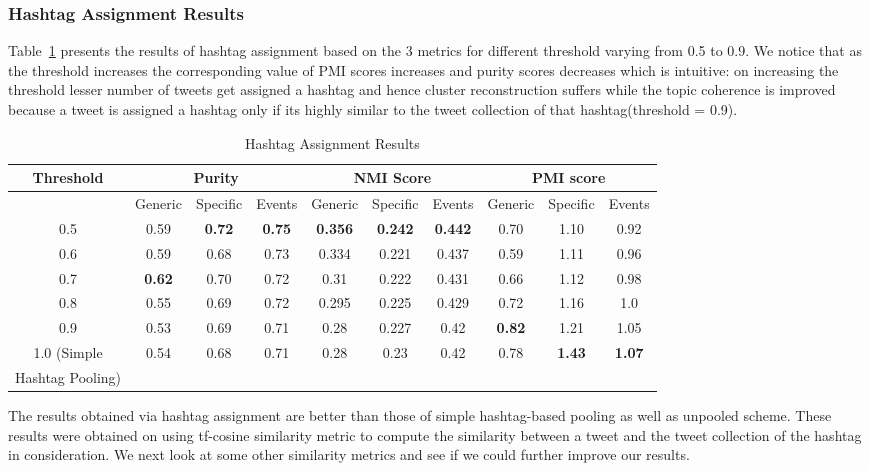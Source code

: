 \documentclass[10pt,a5paper,twoside]{article}
\begin{document}

\subsubsection{Hashtag Assignment Results}
Table~\ref{tbl-9} presents the results of hashtag assignment based on the 3 metrics for different threshold varying from 0.5 to 0.9. We notice that as the threshold increases the corresponding value of PMI scores increases and purity scores decreases which is intuitive: on increasing the threshold lesser number of tweets get assigned a hashtag and hence cluster reconstruction suffers while the topic coherence is improved because a tweet is assigned a hashtag only if its highly similar to the tweet collection of that hashtag(threshold = 0.9). 
\\

\begin{table}[!h]
\centering
\resizebox{14cm}{!} 
{
	\begin{tabular}{|c|ccc|ccc|ccc|}
	\hline
	\footnotesize{Threshold}  & \multicolumn {3}{c}{Purity} & \multicolumn {3}{c}{NMI Score} & \multicolumn {3}{c|}{PMI score}\\
	\hline
	 & Generic & Specific & Events &  Generic & Specific & Events &  Generic & Specific & Events\\
	\hline
	0.5 & 0.59 & \textbf{0.72} & \textbf{0.75} & \textbf{0.356} & \textbf{0.242} & \textbf{0.442} & 0.70 & 1.10 & 0.92 \\
	\hline
	0.6 & 0.59 & 0.68 & 0.73 & 0.334 & 0.221 & 0.437 & 0.59 & 1.11 & 0.96 \\
	\hline
	0.7 & \textbf{0.62} & 0.70 & 0.72 & 0.31 & 0.222 & 0.431 & 0.66 & 1.12 & 0.98 \\
	\hline
	0.8 & 0.55 & 0.69 & 0.72 & 0.295 & 0.225 & 0.429 & 0.72 & 1.16 & 1.0 \\
	\hline
	0.9 & 0.53 & 0.69 & 0.71 & 0.28 & 0.227 & 0.42 & \textbf{0.82} & 1.21 & 1.05 \\
	\hline
	1.0 (\small Simple & 0.54 & 0.68 & 0.71 & 0.28 & 0.23 & 0.42 & 0.78 & \textbf{1.43} & \textbf{1.07} \\
	\small Hashtag Pooling) & & & & & & & & & \\
	\hline
	\end{tabular}
}
\caption{Hashtag Assignment Results}\label{tbl-9}
\end{table}

The results obtained via hashtag assignment are better than those of simple hashtag-based pooling as well as unpooled scheme. These results were obtained on using tf-cosine similarity metric to compute the similarity between a tweet and the tweet collection of the hashtag in consideration. We next look at some other similarity metrics and see if we could further improve our results.
\end{document}
